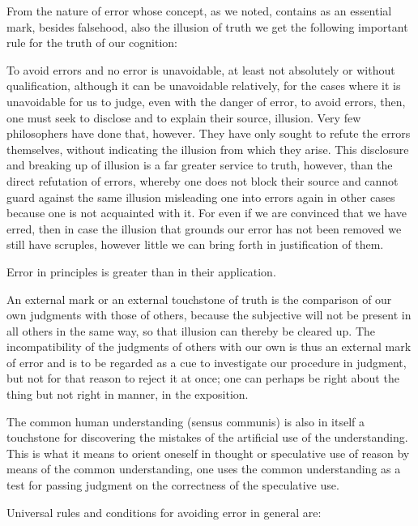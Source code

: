     From the nature of error whose concept, as we noted,
    contains as an essential mark, besides falsehood,
    also the illusion of truth
    we get the following important rule
    for the truth of our cognition:

        To avoid errors and no error is unavoidable,
        at least not absolutely or without qualification,
        although it can be unavoidable relatively,
        for the cases where it is unavoidable for us to judge,
        even with the danger of error,
        to avoid errors, then, one must seek to
        disclose and to explain their source, illusion.
        Very few philosophers have done that, however.
        They have only sought to refute the errors themselves,
        without indicating the illusion from which they arise.
        This disclosure and breaking up of illusion is
        a far greater service to truth, however, than the direct refutation
        of errors, whereby one does not block their source and cannot guard
        against the same illusion misleading one into errors again in other cases
        because one is not acquainted with it.
        For even if we are convinced that we have erred,
        then in case the illusion that grounds our error
        has not been removed we still have scruples,
        however little we can bring forth in justification of them.

    Error in principles is greater than in their application.

    An external mark or an external touchstone of truth is
    the comparison of our own judgments with those of others,
    because the subjective will not be present in all others in the same way,
    so that illusion can thereby be cleared up.
    The incompatibility of the judgments of others with our own is
    thus an external mark of error and is to be regarded as a cue to investigate
    our procedure in judgment, but not for that reason to reject it at once;
    one can perhaps be right about the thing but not right in manner,
    in the exposition.

    The common human understanding (sensus communis) is also in itself
    a touchstone for discovering the mistakes of the artificial use
    of the understanding.
    This is what it means to orient oneself in thought or
    speculative use of reason by means of the common understanding,
    one uses the common understanding as a test for passing judgment
    on the correctness of the speculative use.

    Universal rules and conditions for avoiding error in general are:

